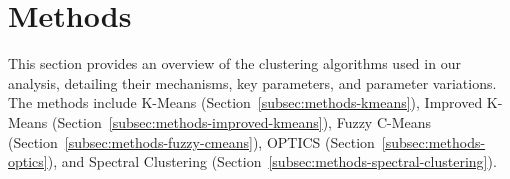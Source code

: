 \section{Methods}
\label{sec:methods}

This section provides an overview of the clustering algorithms used in our analysis, detailing their mechanisms, key parameters, and parameter variations. The methods include K-Means (Section~\ref{subsec:methods-kmeans}), Improved K-Means (Section~\ref{subsec:methods-improved-kmeans}), Fuzzy C-Means (Section~\ref{subsec:methods-fuzzy-cmeans}), OPTICS (Section~\ref{subsec:methods-optics}), and Spectral Clustering (Section~\ref{subsec:methods-spectral-clustering}).





